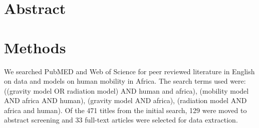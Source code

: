 \documentclass{article}
\begin{document}
\section*{Abstract}

\section*{Methods}

We searched PubMED and Web of Science for peer reviewed literature 
in English on data and models on human mobility in Africa. The search terms
used were: ((gravity model OR radiation model) AND human and
africa), (mobility model AND africa AND human), (gravity model AND
africa), (radiation model AND africa and human). Of the 471 titles
from the initial search, 129 were moved to abstract screening and 33
full-text articles were selected for data extraction.
\end{document}
